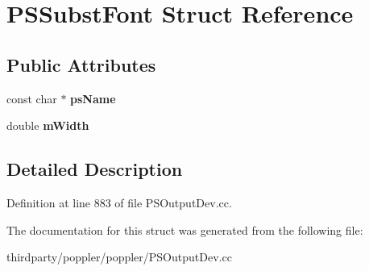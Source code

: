 \hypertarget{struct_p_s_subst_font}{}\section{P\+S\+Subst\+Font Struct Reference}
\label{struct_p_s_subst_font}
\subsection*{Public Attributes}
\begin{DoxyCompactItemize}
\item 
\mbox{\label{struct_p_s_subst_font_a61f1771fa645749841b3ffbdedf2adc8}} 
const char $\ast$ {\bfseries ps\+Name}
\item 
\mbox{\label{struct_p_s_subst_font_a376463f29cbebf63a3656d17f1584804}} 
double {\bfseries m\+Width}
\end{DoxyCompactItemize}


\subsection{Detailed Description}


Definition at line 883 of file P\+S\+Output\+Dev.\+cc.



The documentation for this struct was generated from the following file\+:\begin{DoxyCompactItemize}
\item 
thirdparty/poppler/poppler/P\+S\+Output\+Dev.\+cc\end{DoxyCompactItemize}
